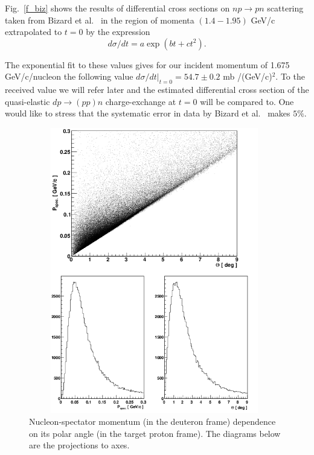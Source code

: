 \documentclass[a4paper,12pt]{article}
\begin{document}
Fig.~\ref{f_biz} shows the results of differential cross sections on
$ np \to pn $ scattering taken from Bizard et al.~\cite{a12} in the region of
momenta $ (1.4 - 1.95) $ GeV/c extrapolated to $t = 0 $ by the expression
\begin{displaymath}
  d\sigma/dt = a \exp(bt+ct^2).
\end{displaymath}

The exponential fit to these values  gives for our incident momentum of  1.675
GeV/c/nucleon the following value $d \sigma/dt | _ {t=0} = 54.7 \pm 0.2$
mb /(GeV/c)$^{2}$. To the received value we will refer later and  the estimated
differential cross section of the quasi-elastic $dp \to (pp) n $ charge-exchange
at $t = 0 $ will be compared to. One would like to stress that the systematic
error in data by Bizard et al.~\cite{a12} makes $5\%$.

\begin{figure}[!hbp]
  \begin{center}
    \includegraphics[angle=0,height=12.5cm,width=11cm]{fig_theta_p.png}
    \caption { Nucleon-spectator momentum (in the deuteron frame) dependence on
      its polar angle (in the target proton frame). The diagrams below  are the
      projections to axes.}
    \label{f_tp}
  \end{center}
\end{figure}
\end{document}
